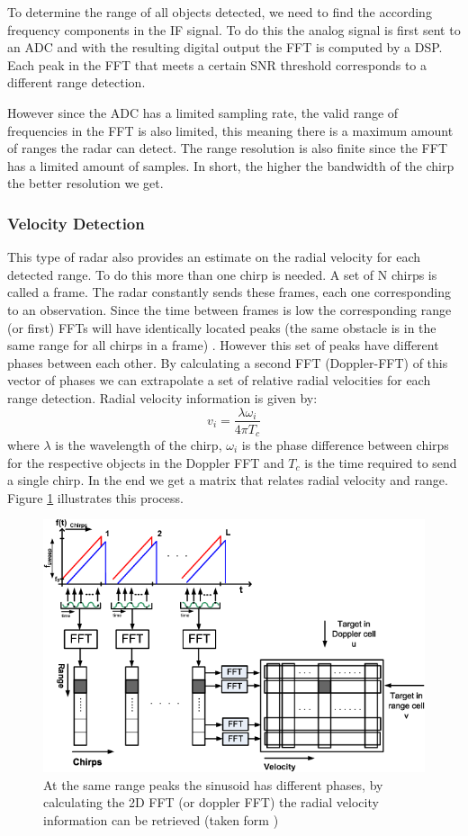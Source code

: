 To determine the range of all objects detected, we need to find the according frequency components in the \ac{IF} signal. To do this the analog signal is first sent to an \ac{ADC} and with the resulting digital output the \ac{FFT} is computed by a \ac{DSP}. Each peak in the \ac{FFT} that meets a certain \ac{SNR} threshold corresponds to a different range detection. 
 
 However since the \ac{ADC} has a limited sampling rate, the valid range of frequencies in the \ac{FFT} is also limited, this meaning there is a maximum amount of ranges the radar can detect.
The range resolution is also finite since the \ac{FFT} has a limited amount of samples. In short, the higher the bandwidth of the chirp the better resolution we get.


\subsubsection{Velocity Detection}
This type of radar also provides an estimate on the radial velocity for each detected range. To do this more than one chirp is needed. A set of N chirps is called a frame. The radar constantly sends these frames, each one corresponding to an observation. Since the time between frames is low the corresponding range (or first) \ac{FFT}s will have  identically located peaks (the same obstacle is in the same range for all chirps in a frame) . However this set of peaks have different phases between each other. By calculating a second \ac{FFT} (Doppler-FFT) of this vector of phases we can extrapolate a set of relative radial velocities  for each range detection. Radial velocity information is given by:
\begin{equation}
    v_i=\frac{\lambda \omega_i}{4 \pi T_c}
    \label{eq:2}
\end{equation}
where $\lambda$ is the wavelength of the chirp, $\omega_i$ is the phase difference between chirps for the respective objects in the Doppler FFT and $T_c$ is the time required to send a single chirp.
In the end we get a matrix that relates radial velocity and range. 
Figure \ref{fig:matrix} illustrates this process.
\begin{figure}[ht] 
\centerline{\includegraphics [width=0.7 \textwidth]{imgs/chapter2/dopplerFFT2.png}}
\caption[2D FFT for retrieving velocity information]{At the same range peaks the sinusoid has different phases, by calculating the 2D FFT (or doppler FFT) the radial velocity information can be retrieved (taken form \cite{schroeder2010x})}
\label{fig:matrix}
\end{figure}

